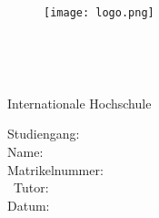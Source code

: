 \begin{titlepage}
    \begin{figure}[h]
        \centering
        \texttt{[image: logo.png]}
    \end{figure}
    
    \vspace{5cm}

    \begin{center}
        \begin{Large}
            \paperType\
        \end{Large}

        \begin{large}
            \paperCourse\ \\
        \end{large}
    
        \vspace{1cm}

        \begin{large}
            Internationale Hochschule
        \end{large}
    \end{center}

    \vspace*{\fill}

    \begin{large}
        \noindent Studiengang:\tabto{4cm} \textbf{\degreeProgram} \\
        Name:\tabto{4cm} \textbf{\@author} \\
        Matrikelnummer:\tabto{4cm} \textbf{\studentNumber} \\
        \ifdefined\tutorName\
        Tutor:\tabto{4cm} \textbf{\tutorName} \\
        \else
        \fi
        Datum:\tabto{4cm} \textbf{\@date}
    \end{large}
 \end{titlepage}